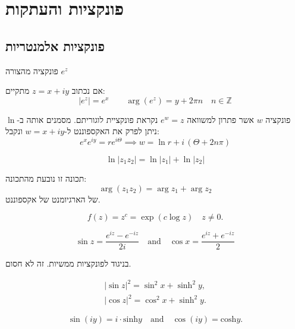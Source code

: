 \documentclass{tstextbook}
\begin{document}
\section{פונקציות והעתקות}

\subsection{פונקציות אלמנטריות}

\begin{definition}
פונקציה מהצורה \(e^z\)

\end{definition}
\begin{proposition}
אם נכתוב \(z=x+iy\) מתקיים:
$$\lvert e^z \rvert =e^x\qquad \arg(e^z)=y+2\pi n\quad n\in \mathbb{Z}$$

\end{proposition}
\begin{definition}
פונקציה \(w\) אשר פתרון למשוואה \(e^w=z\) נקראת פונקציית לוגוריתם. מסמנים אותה ב-\(\ln\) ניתן לפרק את האקספוננט ל-\(w=x+iy\) ונקבל:
$$e^xe^{iy}=re^{i\Theta} \implies w=\ln r+i\,\left( \Theta+2n\pi 
\right)$$

\end{definition}
\begin{proposition}
$$\ln|z_{1}z_{2}|=\ln|z_{1}|+\ln|z_{2}|$$

\end{proposition}
תכונה זו נובעת מהתכונה:
$$\arg(z_{1}z_{2})=\arg z_{1}+\arg z_{2}$$
של הארגיומנט של אקספוננט.

\begin{definition}
$$f(z)=z^{c}=\exp(c\log z)\quad z\neq0.$$

\end{definition}
\begin{definition}
$$\sin z={\frac{e^{i z}-e^{-i z}}{2i}}\quad{\mathrm{and}}\quad\cos x={\frac{e^{i z}+e^{-i z}}{2}}$$

\end{definition}
בניגוד לפונקציות ממשיות. זה לא חסום.

\begin{proposition}
$$\begin{array}{l}{{|\sin z|^{2}=\sin^{2}x+\sinh^{2}y,}}\\ {{|\cos z|^{2}=\cos^{2}x+\sinh^{2}y.}}\end{array}$$

\end{proposition}
\begin{proposition}
$$\sin(i y)=i\cdot\mathrm{sinh}y\quad\mathrm{and}\quad\cos(i y)=\mathrm{cosh}y.$$

\end{proposition}
\end{document}
